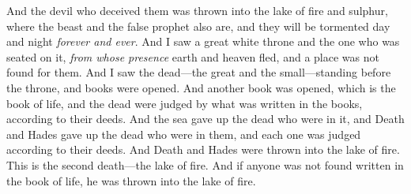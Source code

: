 \begin{biblechapter}
\verse And the devil who deceived them was thrown into the lake of fire and sulphur, where the beast and the false prophet also are, and they will be tormented day and night \textit{forever and ever}.
 And I saw a great white throne and the one who was seated on it, \textit{from whose presence} earth and heaven fled, and a place was not found for them.
\verse And I saw the dead—the great and the small—standing before the throne, and books were opened. And another book was opened, which is the book of life, and the dead were judged by what was written in the books, according to their deeds.
\verse And the sea gave up the dead who were in it, and Death and Hades gave up the dead who were in them, and each one was judged according to their deeds.
\verse And Death and Hades were thrown into the lake of fire. This is the second death—the lake of fire.
\verse And if anyone was not found written in the book of life, he was thrown into the lake of fire.
\end{biblechapter}

